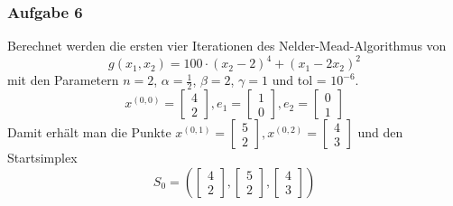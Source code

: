 \documentclass[a4paper, 12pt]{report}
\begin{document}
\subsubsection{Aufgabe 6}
Berechnet werden die ersten vier Iterationen des Nelder-Mead-Algorithmus von
$$g(x_1, x_2) = 100\cdot(x_2-2)^4 + (x_1 - 2x_2)^2$$
mit den Parametern $n=2$, $\alpha = \frac{1}{2}$, $\beta = 2$, $\gamma = 1$ und tol = $10^{-6}$.
$$x^{(0,0)} = \begin{bmatrix}4\\2\end{bmatrix}, e_1 = \begin{bmatrix}1\\0\end{bmatrix}, e_2 = \begin{bmatrix}0\\1\end{bmatrix}$$
Damit erhält man die Punkte $x^{(0,1)} = \begin{bmatrix}5\\2\end{bmatrix}, x^{(0,2)} = \begin{bmatrix}4\\3\end{bmatrix}$ und den
Startsimplex
$$S_0 = \left(\begin{bmatrix}4\\2\end{bmatrix}, \begin{bmatrix}5\\2\end{bmatrix}, \begin{bmatrix}4\\3\end{bmatrix}\right)$$
\end{document}
